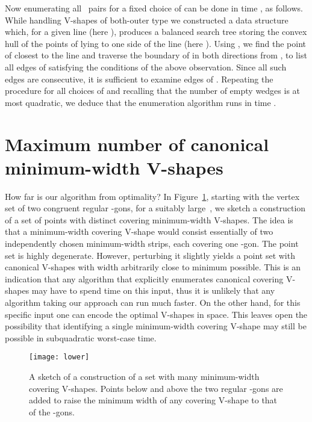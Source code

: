 \documentclass{llncs}
\begin{document}
Now enumerating all ~pairs  for a fixed choice of  can be
done in time , as follows.
While handling V-shapes of both-outer type
we constructed a data structure  which, for a given line (here
), produces a balanced search tree storing the convex hull of the
points of  lying to one side of the line (here ).  Using
, we find the point  of  closest to the line  and
traverse the boundary of  in both directions from ,
to list all  edges  of  satisfying the conditions
of the above observation.  
Since all such edges are consecutive, it is sufficient to examine
 edges of .
Repeating the procedure for all choices of  and recalling that
the number of empty wedges is at most quadratic, we deduce that the
enumeration algorithm runs in time .



\section{Maximum number of canonical minimum-width V-shapes}
\label{sec:lower-bound}

How far is our algorithm from optimality?  In Figure~\ref{fig:lower},
starting with the vertex set of two congruent regular -gons, for a
suitably large~, we sketch a construction of a set of  points
with  distinct covering minimum-width V-shapes.  The idea
is that a minimum-width covering V-shape would consist essentially of
two independently chosen minimum-width strips, each covering one
-gon.  The point set is highly degenerate.  However, perturbing it
slightly yields a point set with  canonical V-shapes with
width arbitrarily close to minimum possible.  This is an indication
that any algorithm that explicitly enumerates canonical covering
V-shapes may have to spend  time on this input, thus it
is unlikely that any algorithm taking our approach can run much
faster.  On the other hand, for this specific input one can encode the
 optimal V-shapes in  space.  This leaves open
the possibility that identifying a single minimum-width covering
V-shape may still be possible in subquadratic worst-case time.

\begin{figure}
  \centering
  \texttt{[image: lower]}
  \caption{A sketch of a construction of a set with many minimum-width
    covering V-shapes.  Points below and above the two regular
    -gons are added to raise the minimum width of any covering
    V-shape to that of the -gons.}
  \label{fig:lower}
\end{figure}
\end{document}
